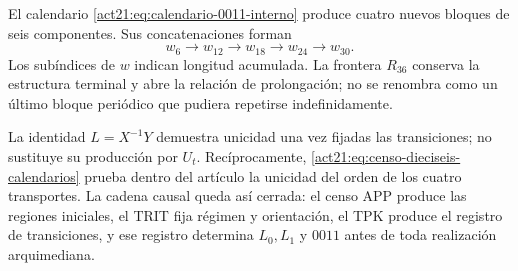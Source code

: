 El calendario \eqref{act21:eq:calendario-0011-interno} produce cuatro nuevos
bloques de seis componentes. Sus concatenaciones forman
\[
 w_6\longrightarrow w_{12}\longrightarrow w_{18}
 \longrightarrow w_{24}\longrightarrow w_{30}.
\]
Los subíndices de \(w\) indican longitud acumulada. La frontera \(R_{36}\) conserva la estructura terminal y abre la relación de prolongación; no se renombra como un último bloque periódico que pudiera repetirse indefinidamente.

La identidad \(L=X^{-1}Y\) demuestra unicidad una vez fijadas las
transiciones; no sustituye su producción por \(U_t\). Recíprocamente,
\eqref{act21:eq:censo-dieciseis-calendarios} prueba dentro del artículo la unicidad
del orden de los cuatro transportes. La cadena causal queda así cerrada:
el censo APP produce las regiones iniciales, el TRIT fija régimen y
orientación, el TPK produce el registro de transiciones, y ese registro
determina \(L_0,L_1\) y \(0011\) antes de toda realización arquimediana.

